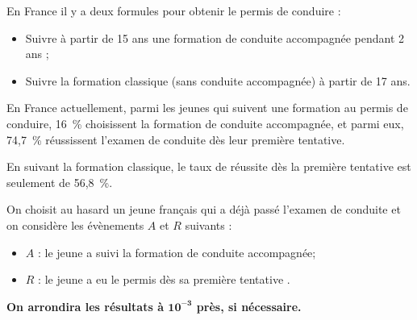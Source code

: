 \medskip

	En France il y a deux formules pour obtenir le permis de conduire :

	\begin{itemize}[label*={\textbullet~}]
		\item Suivre à partir de 15 ans une formation de conduite accompagnée pendant 2 ans ;
		\item Suivre la formation classique (sans conduite accompagnée) à partir de 17 ans.
	\end{itemize}

	\medskip

	En France actuellement, parmi les jeunes qui suivent une formation au permis de conduire, 16~\% choisissent la formation de conduite accompagnée, et parmi eux, 74,7~\% réussissent l'examen de conduite dès leur première tentative.


	En suivant la formation classique, le taux de réussite dès la première tentative est seulement de 56,8~\%.

	\bigskip

	On choisit au hasard un jeune français qui a déjà passé l'examen de conduite et on considère les évènements $A$ et $R$ suivants :

	\begin{itemize}[label*={\textbullet~}]
		\item $A$ : \og le jeune a suivi la formation de conduite accompagnée\fg{};
		\item $R$ : \og le jeune a eu le permis dès sa première tentative \fg{}.
	\end{itemize}

	\medskip

	\textbf{On arrondira les résultats à $\mathbf{10}^{\mathbf{-3}}$ près, si nécessaire.}

	\medskip

